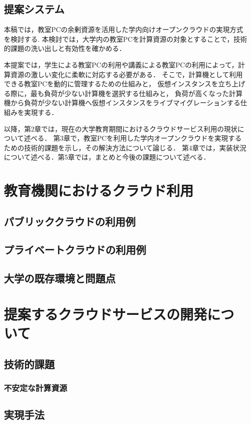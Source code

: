 \subsection{提案システム}
本稿では，教室PCの余剰資源を活用した学内向けオープンクラウドの実現方式を検討する.
本検討では，大学内の教室PCを計算資源の対象とすることで，技術的課題の洗い出しと有効性を確かめる．
\par 本提案では，学生による教室PCの利用や講義による教室PCの利用によって，計算資源の激しい変化に柔軟に対応する必要がある．
そこで，計算機として利用できる教室PCを動的に管理するための仕組みと，
仮想インスタンスを立ち上げる際に，最も負荷が少ない計算機を選択する仕組みと，
負荷が高くなった計算機から負荷が少ない計算機へ仮想インスタンスをライブマイグレーションする仕組みを実現する．
\par 以降，第2章では，現在の大学教育期間におけるクラウドサービス利用の現状について述べる．
第3章で，教室PCを利用した学内オープンクラウドを実現するための技術的課題を示し，その解決方法について論じる．
第4章では，実装状況について述べる．第5章では，まとめと今後の課題について述べる．

\section{教育機関におけるクラウド利用}
\subsection{パブリッククラウドの利用例}
\subsection{プライベートクラウドの利用例}
\subsection{大学の既存環境と問題点}

\section{提案するクラウドサービスの開発について}
\subsection{技術的課題}
\subsubsection{不安定な計算資源}
\subsection{実現手法}
